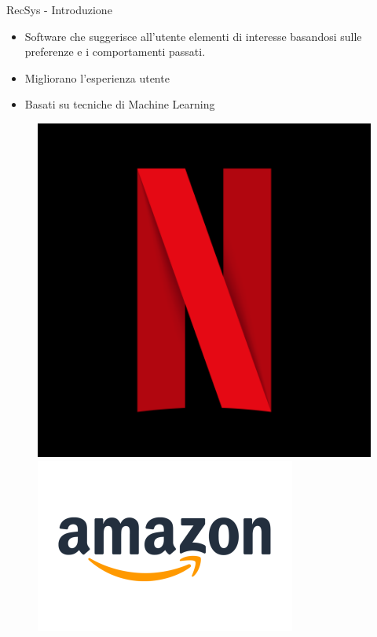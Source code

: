 \begin{frame}{RecSys - Introduzione}
\begin{itemize}
\item Software che suggerisce all'utente elementi di interesse basandosi sulle preferenze e i comportamenti passati.
    \item Migliorano l'esperienza utente
    \item Basati su tecniche di Machine Learning
\end{itemize}
\begin{figure}[h!]
    \centering
    \begin{minipage}{0.15\textwidth}
        \centering
        \includegraphics[width=\textwidth]{images/netflix.png}
    \end{minipage}\hfill
    \begin{minipage}{0.15\textwidth}
        \centering
        \includegraphics[width=\textwidth]{images/amazon.png}

\end{minipage}
\end{figure}
\end{frame}
